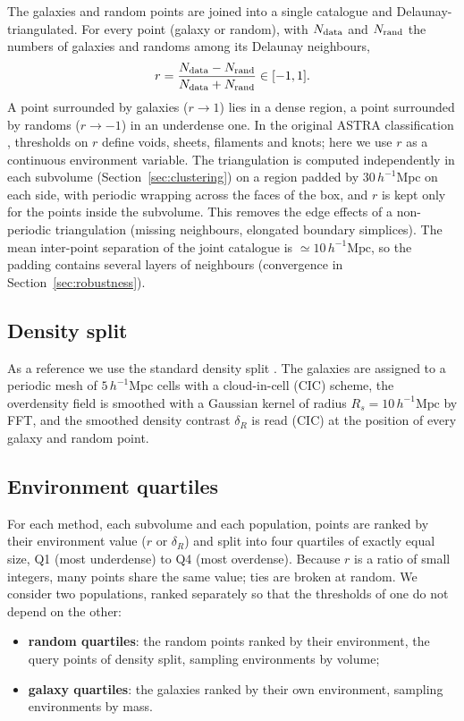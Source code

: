 \documentclass[11pt,twocolumn]{article}
\newcommand{\Mpch}{\,h^{-1}\mathrm{Mpc}}
\begin{document}
The galaxies and random points are joined into a single catalogue and Delaunay-triangulated. For every point (galaxy or random), with $N_{\rm data}$ and $N_{\rm rand}$ the numbers of galaxies and randoms among its Delaunay neighbours,
\begin{equation}
r = \frac{N_{\rm data}-N_{\rm rand}}{N_{\rm data}+N_{\rm rand}} \in [-1,1].
\label{eq:astra_r}
\end{equation}
A point surrounded by galaxies ($r\to1$) lies in a dense region, a point surrounded by randoms ($r\to-1$) in an underdense one. In the original ASTRA classification \cite{ASTRA}, thresholds on $r$ define voids, sheets, filaments and knots; here we use $r$ as a continuous environment variable. The triangulation is computed independently in each subvolume (Section~\ref{sec:clustering}) on a region padded by $30\Mpch$ on each side, with periodic wrapping across the faces of the box, and $r$ is kept only for the points inside the subvolume. This removes the edge effects of a non-periodic triangulation (missing neighbours, elongated boundary simplices). The mean inter-point separation of the joint catalogue is $\simeq10\Mpch$, so the padding contains several layers of neighbours (convergence in Section~\ref{sec:robustness}).

\subsection{Density split}

As a reference we use the standard density split \cite{Paillas2023}. The galaxies are assigned to a periodic mesh of $5\Mpch$ cells with a cloud-in-cell (CIC) scheme, the overdensity field is smoothed with a Gaussian kernel of radius $R_s=10\Mpch$ by FFT, and the smoothed density contrast $\delta_R$ is read (CIC) at the position of every galaxy and random point.

\subsection{Environment quartiles}

For each method, each subvolume and each population, points are ranked by their environment value ($r$ or $\delta_R$) and split into four quartiles of exactly equal size, Q1 (most underdense) to Q4 (most overdense). Because $r$ is a ratio of small integers, many points share the same value; ties are broken at random. We consider two populations, ranked separately so that the thresholds of one do not depend on the other:
\begin{itemize}
\item \textbf{random quartiles}: the random points ranked by their environment, the query points of density split, sampling environments by volume;
\item \textbf{galaxy quartiles}: the galaxies ranked by their own environment, sampling environments by mass.
\end{itemize}
\end{document}
